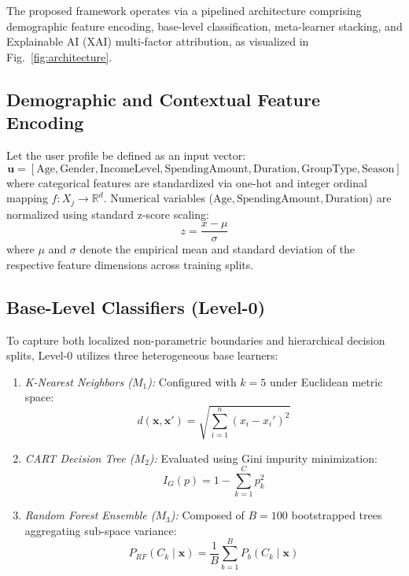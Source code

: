 \documentclass[conference]{IEEEtran}
\begin{document}
The proposed framework operates via a pipelined architecture comprising demographic feature encoding, base-level classification, meta-learner stacking, and Explainable AI (XAI) multi-factor attribution, as visualized in Fig.~\ref{fig:architecture}.

\subsection{Demographic and Contextual Feature Encoding}
Let the user profile be defined as an input vector:
\begin{equation}
\mathbf{u} = \left[ \text{Age}, \text{Gender}, \text{IncomeLevel}, \text{SpendingAmount}, \text{Duration}, \text{GroupType}, \text{Season} \right]
\end{equation}
where categorical features are standardized via one-hot and integer ordinal mapping $f: X_j \to \mathbb{R}^d$. Numerical variables ($\text{Age}, \text{SpendingAmount}, \text{Duration}$) are normalized using standard z-score scaling:
\begin{equation}
z = \frac{x - \mu}{\sigma}
\end{equation}
where $\mu$ and $\sigma$ denote the empirical mean and standard deviation of the respective feature dimensions across training splits.

\subsection{Base-Level Classifiers (Level-0)}
To capture both localized non-parametric boundaries and hierarchical decision splits, Level-0 utilizes three heterogeneous base learners:
\begin{enumerate}
    \item \textit{K-Nearest Neighbors ($M_1$):} Configured with $k=5$ under Euclidean metric space:
    \begin{equation}
    d(\mathbf{x}, \mathbf{x}') = \sqrt{\sum_{i=1}^n (x_i - x_i')^2}
    \end{equation}
    \item \textit{CART Decision Tree ($M_2$):} Evaluated using Gini impurity minimization:
    \begin{equation}
    I_G(p) = 1 - \sum_{k=1}^C p_k^2
    \end{equation}
    \item \textit{Random Forest Ensemble ($M_3$):} Composed of $B=100$ bootstrapped trees aggregating sub-space variance:
    \begin{equation}
    P_{RF}(C_k \mid \mathbf{x}) = \frac{1}{B} \sum_{b=1}^B P_b(C_k \mid \mathbf{x})
    \end{equation}
\end{enumerate}
\end{document}
